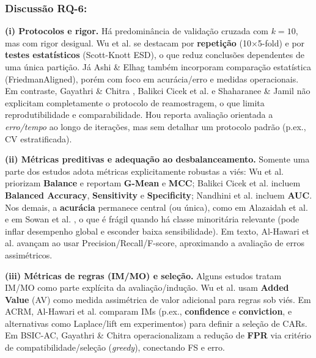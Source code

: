 \subsubsection{Discussão RQ-6:}
\textbf{(i) Protocolos e rigor.}
Há predominância de validação cruzada com $k{=}10$, mas com rigor desigual. Wu et al. \cite{wu2024novel}
se destacam por \textbf{repetição} (10$\times$5-fold) e por \textbf{testes estatísticos} (Scott-Knott ESD),
o que reduz conclusões dependentes de uma única partição. Já Ashi \& Elhag \cite{ashi2021enhancing}
também incorporam comparação estatística (FriedmanAligned), porém com foco em acurácia/erro e medidas operacionais.
Em contraste, Gayathri \& Chitra \cite{gayathri2015efficient}, Balikci Cicek et al. \cite{cicek2021assessment}
e Shaharanee \& Jamil \cite{shaharanee2015irrelevant} não explicitam completamente o protocolo de reamostragem,
o que limita reprodutibilidade e comparabilidade. Hou \cite{hou2025improved} reporta avaliação orientada a
\textit{erro/tempo} ao longo de iterações, mas sem detalhar um protocolo padrão (p.ex., CV estratificada).

\textbf{(ii) Métricas preditivas e adequação ao desbalanceamento.}
Somente uma parte dos estudos adota métricas explicitamente robustas a viés: Wu et al. \cite{wu2024novel}
priorizam \textbf{Balance} e reportam \textbf{G-Mean} e \textbf{MCC}; Balikci Cicek et al. \cite{cicek2021assessment}
incluem \textbf{Balanced Accuracy}, \textbf{Sensitivity} e \textbf{Specificity}; Nandhini et al. \cite{nandhini2020performance}
incluem \textbf{AUC}. Nos demais, a \textbf{acurácia} permanece central (ou única), como em Alazaidah et al.
\cite{alazaidah2021feature} e em Sowan et al. \cite{sowan2023hybrid}, o que é frágil quando há classe minoritária
relevante (pode inflar desempenho global e esconder baixa sensibilidade). Em texto, Al-Hawari et al.
\cite{alhawari2021classification} avançam ao usar Precision/Recall/F-score, aproximando a avaliação de erros assimétricos.

\textbf{(iii) Métricas de regras (IM/MO) e seleção.}
Alguns estudos tratam IM/MO como parte explícita da avaliação/indução. Wu et al. \cite{wu2024novel} usam
\textbf{Added Value} (AV) como medida assimétrica de valor adicional para regras sob viés. Em ACRM, Al-Hawari et al.
\cite{alhawari2021classification} comparam IMs (p.ex., \textbf{confidence} e \textbf{conviction}, e alternativas como
Laplace/lift em experimentos) para definir a seleção de CARs. Em BSIC-AC, Gayathri \& Chitra \cite{gayathri2015efficient}
operacionalizam a redução de \textbf{FPR} via critério de compatibilidade/seleção (\textit{greedy}), conectando FS e erro.

